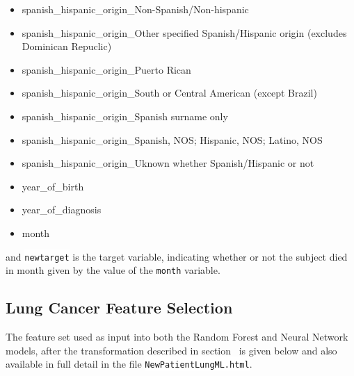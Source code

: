 \documentclass[10pt,letterpaper]{article}
\newcommand{\codewhite}[1]{\colorbox{white}{\texttt{#1}}}
\begin{document}
\begin{itemize}[noitemsep]
\item spanish\_hispanic\_origin\_Non-Spanish/Non-hispanic
\item spanish\_hispanic\_origin\_Other specified Spanish/Hispanic origin (excludes Dominican Repuclic)
\item spanish\_hispanic\_origin\_Puerto Rican
\item spanish\_hispanic\_origin\_South or Central American (except Brazil)
\item spanish\_hispanic\_origin\_Spanish surname only
\item spanish\_hispanic\_origin\_Spanish, NOS; Hispanic, NOS; Latino, NOS
\item spanish\_hispanic\_origin\_Uknown whether Spanish/Hispanic or not
\item year\_of\_birth
\item year\_of\_diagnosis
\item month
\end{itemize}


and 
\codewhite{newtarget} is the target variable, indicating whether or not the subject died in month given by the value of the \codewhite{month} variable.






\subsection*{Lung Cancer Feature Selection}
\label{Lung_Cancer_Feature_Selection}

The feature set used as input into both the Random Forest and Neural Network models, after the transformation described in section~ is given below and also available in full detail in the file 
\codewhite{NewPatientLungML.html}.
\end{document}
